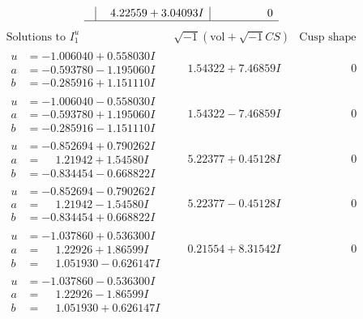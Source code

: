 \documentclass[1p]{elsarticle_modified}
\theoremstyle{definition}
\newcommand{\I}{\sqrt{-1}}
\begin{document}
$$\begin{array}{c|c|c}
 & \phantom{-}4.22559 + 3.04093 I & \phantom{-0.000000 } 0\\
 \hline 
 \end{array}$$\newpage$$\begin{array}{c|c|c}  
\text{Solutions to }I^u_{1}& \I (\text{vol} + \sqrt{-1}CS) & \text{Cusp shape}\\
 \hline 
\begin{aligned}
u &= -1.006040 + 0.558030 I \\
a &= -0.593780 - 1.195060 I \\
b &= -0.285916 + 1.151110 I\end{aligned}
 & \phantom{-}1.54322 + 7.46859 I & \phantom{-0.000000 } 0 \\ \hline\begin{aligned}
u &= -1.006040 - 0.558030 I \\
a &= -0.593780 + 1.195060 I \\
b &= -0.285916 - 1.151110 I\end{aligned}
 & \phantom{-}1.54322 - 7.46859 I & \phantom{-0.000000 } 0 \\ \hline\begin{aligned}
u &= -0.852694 + 0.790262 I \\
a &= \phantom{-}1.21942 + 1.54580 I \\
b &= -0.834454 - 0.668822 I\end{aligned}
 & \phantom{-}5.22377 + 0.45128 I & \phantom{-0.000000 } 0 \\ \hline\begin{aligned}
u &= -0.852694 - 0.790262 I \\
a &= \phantom{-}1.21942 - 1.54580 I \\
b &= -0.834454 + 0.668822 I\end{aligned}
 & \phantom{-}5.22377 - 0.45128 I & \phantom{-0.000000 } 0 \\ \hline\begin{aligned}
u &= -1.037860 + 0.536300 I \\
a &= \phantom{-}1.22926 + 1.86599 I \\
b &= \phantom{-}1.051930 - 0.626147 I\end{aligned}
 & \phantom{-}0.21554 + 8.31542 I & \phantom{-0.000000 } 0 \\ \hline\begin{aligned}
u &= -1.037860 - 0.536300 I \\
a &= \phantom{-}1.22926 - 1.86599 I \\
b &= \phantom{-}1.051930 + 0.626147 I\end{aligned}

\end{array}$$
\end{document}
